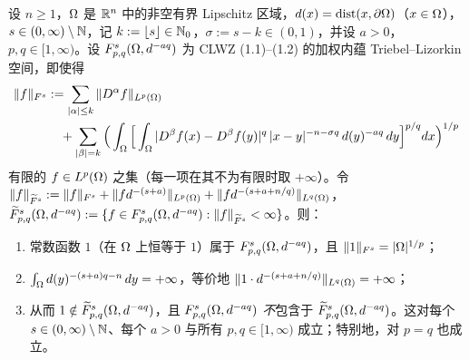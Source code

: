 \begin{proposition}
设 $n\ge1$，$\Omega$ 是 $\mathbb{R}^n$ 中的非空有界 Lipschitz 区域，$d(x)=\operatorname{dist}(x,\partial\Omega)$（$x\in\Omega$），$s\in(0,\infty)\setminus\mathbb{N}$，记 $k:=\lfloor s\rfloor\in\mathbb{N}_0$，$\sigma:=s-k\in(0,1)$，并设 $a>0$，$p,q\in[1,\infty)$。设 $F^{s}_{p,q}(\Omega,d^{-aq})$ 为 CLWZ (1.1)--(1.2) 的加权内蕴 Triebel--Lizorkin 空间，即使得
\begin{equation}\label{eq:sec6-f2-norm}
  \begin{split}
    \|f\|_{F^s}
    &:=\sum_{|\alpha|\le k}\|D^\alpha f\|_{L^p(\Omega)}\\
    &\quad+\sum_{|\beta|=k}\Big(\int_\Omega\Big[\int_\Omega|D^\beta f(x)-D^\beta f(y)|^q\,|x-y|^{-n-\sigma q}\,d(y)^{-aq}\,dy\Big]^{p/q}dx\Big)^{1/p}
  \end{split}
\end{equation}
有限的 $f\in L^p(\Omega)$ 之集（每一项在其不为有限时取 $+\infty$）。令 $\|f\|_{\widetilde F^s}:=\|f\|_{F^s}+\|f d^{-(s+a)}\|_{L^p(\Omega)}+\|f d^{-(s+a+n/q)}\|_{L^q(\Omega)}$，$\widetilde F^{s}_{p,q}(\Omega,d^{-aq}):=\{f\in F^{s}_{p,q}(\Omega,d^{-aq}):\|f\|_{\widetilde F^s}<\infty\}$。则：
\begin{enumerate}[label=(\roman*)]
  \item 常数函数 $1$（在 $\Omega$ 上恒等于 $1$）属于 $F^{s}_{p,q}(\Omega,d^{-aq})$，且 $\|1\|_{F^s}=|\Omega|^{1/p}$；
  \item $\int_\Omega d(y)^{-(s+a)q-n}\,dy=+\infty$，等价地 $\|1\cdot d^{-(s+a+n/q)}\|_{L^q(\Omega)}=+\infty$；
  \item 从而 $1\notin\widetilde F^{s}_{p,q}(\Omega,d^{-aq})$，且 $F^{s}_{p,q}(\Omega,d^{-aq})$ \emph{不}包含于 $\widetilde F^{s}_{p,q}(\Omega,d^{-aq})$。这对每个 $s\in(0,\infty)\setminus\mathbb{N}$、每个 $a>0$ 与所有 $p,q\in[1,\infty)$ 成立；特别地，对 $p=q$ 也成立。
\end{enumerate}
\end{proposition}

